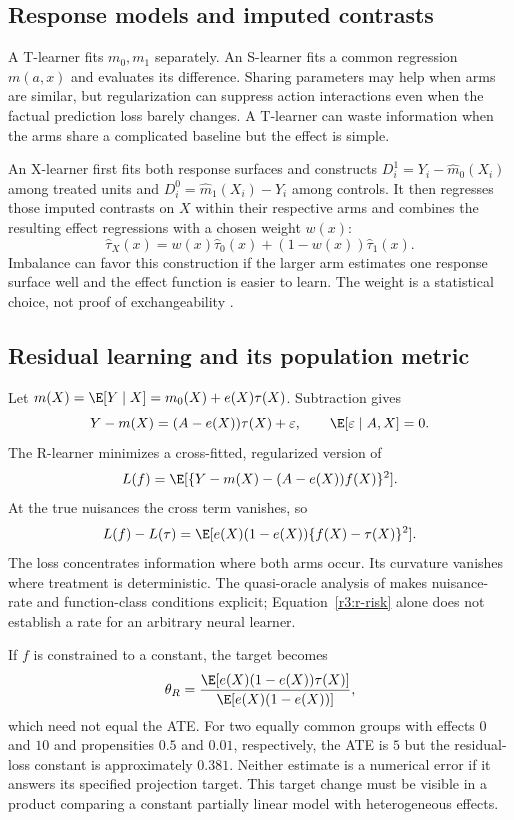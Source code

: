 \subsection{Response models and imputed contrasts}
A T-learner fits $m_0,m_1$ separately. An S-learner fits a common
regression $m(a,x)$ and evaluates its difference. Sharing parameters may
help when arms are similar, but regularization can suppress action
interactions even when the factual prediction loss barely changes. A
T-learner can waste information when the arms share a complicated
baseline but the effect is simple.

An X-learner first fits both response surfaces and constructs
$D_i^1=Y_i-\widehat m_0(X_i)$ among treated units and
$D_i^0=\widehat m_1(X_i)-Y_i$ among controls. It then regresses those
imputed contrasts on $X$ within their respective arms and combines the
resulting effect regressions with a chosen weight $w(x)$:
\[
 \widehat\tau_X(x)=w(x)\widehat\tau_0(x)
                         +(1-w(x))\widehat\tau_1(x).
\]
Imbalance can favor this construction if the larger arm estimates one
response surface well and the effect function is easier to learn. The
weight is a statistical choice, not proof of exchangeability
\citep[Section on the X-learner]{kunzel2019}.

\subsection{Residual learning and its population metric}
Let $m(X)=\E[Y\mid X]=m_0(X)+e(X)\tau(X)$. Subtraction gives
\begin{equation}
 Y-m(X)=(A-e(X))\tau(X)+\varepsilon,
 \qquad \E[\varepsilon\mid A,X]=0.
 \label{r3:robinson}
\end{equation}
The R-learner minimizes a cross-fitted, regularized version of
\[
 L(f)=\E[\{Y-m(X)-(A-e(X))f(X)\}^2].
\]
At the true nuisances the cross term vanishes, so
\begin{equation}
 L(f)-L(\tau)=\E[e(X)(1-e(X))\{f(X)-\tau(X)\}^2].
 \label{r3:r-risk}
\end{equation}
The loss concentrates information where both arms occur. Its curvature
vanishes where treatment is deterministic. The quasi-oracle analysis of
\citet[Sections 2 and 5]{rlearner2020} makes nuisance-rate and
function-class conditions explicit; Equation~\eqref{r3:r-risk} alone
does not establish a rate for an arbitrary neural learner.

If $f$ is constrained to a constant, the target becomes
\[
 \theta_R=\frac{\E[e(X)(1-e(X))\tau(X)]}
                 {\E[e(X)(1-e(X))]},
\]
which need not equal the ATE. For two equally common groups with effects
$0$ and $10$ and propensities $0.5$ and $0.01$, respectively, the ATE
is $5$ but the residual-loss constant is approximately $0.381$.
Neither estimate is a numerical error if it answers its specified
projection target. This target change must be visible in a product
comparing a constant partially linear model with heterogeneous effects.

